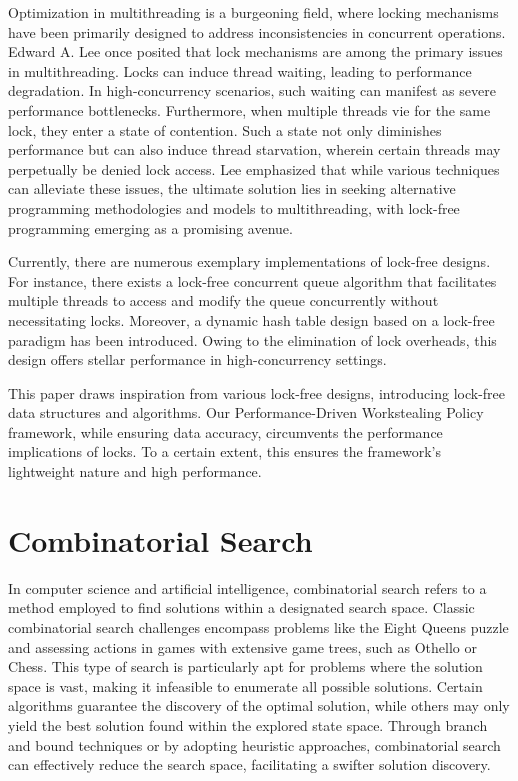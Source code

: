 \documentclass{mproj}
\begin{document}
Optimization in multithreading is a burgeoning field,
where locking mechanisms have been primarily designed to address inconsistencies in concurrent operations.
Edward A. Lee once posited that lock mechanisms are among the primary issues in multithreading\cite{1631937}.
Locks can induce thread waiting, leading to performance degradation.
In high-concurrency scenarios, such waiting can manifest as severe performance bottlenecks.
Furthermore, when multiple threads vie for the same lock, they enter a state of contention.
Such a state not only diminishes performance but can also induce thread starvation,
wherein certain threads may perpetually be denied lock access.
Lee emphasized that while various techniques can alleviate these issues,
the ultimate solution lies in seeking alternative programming methodologies and models to multithreading,
with lock-free programming emerging as a promising avenue.

Currently, there are numerous exemplary implementations of lock-free designs.
For instance, there exists a lock-free concurrent queue algorithm that facilitates multiple threads to access
and modify the queue concurrently without necessitating locks\cite{10.1145/248052.248106}.
Moreover, a dynamic hash table design based on a lock-free paradigm has been introduced.
Owing to the elimination of lock overheads, this design offers stellar performance in high-concurrency settings\cite{10.1145/564870.564881}.

This paper draws inspiration from various lock-free designs,
introducing lock-free data structures and algorithms.
Our Performance-Driven Workstealing Policy framework, while ensuring data accuracy,
circumvents the performance implications of locks.
To a certain extent, this ensures the framework's lightweight nature and high performance.

\section{Combinatorial Search}
In computer science and artificial intelligence, combinatorial search refers to a method employed
to find solutions within a designated search space.
Classic combinatorial search challenges encompass problems like the Eight Queens puzzle and
assessing actions in games with extensive game trees, such as Othello or Chess.
This type of search is particularly apt for problems where the solution space is vast,
making it infeasible to enumerate all possible solutions.
Certain algorithms guarantee the discovery of the optimal solution,
while others may only yield the best solution found within the explored state space.
Through branch and bound techniques or by adopting heuristic approaches,
combinatorial search can effectively reduce the search space, facilitating a swifter solution discovery.
\end{document}
